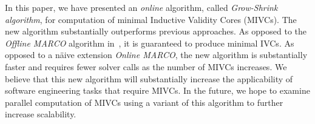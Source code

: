 In this paper, we have presented an {\em online} algorithm, called {\em Grow-Shrink algorithm}, for computation of minimal Inductive Validity Cores (MIVCs). The new algorithm substantially outperforms previous approaches.  As opposed to the {\em Offline MARCO} algorithm in~\cite{Ghass17AllIVCs}, it is guaranteed to produce minimal IVCs.  As opposed to a n\"aive extension {\em Online MARCO}, the new algorithm is substantially faster and requires fewer solver calls as the number of MIVCs increases.  We believe that this new algorithm will substantially increase the applicability of software engineering tasks that require MIVCs.  In the future, we hope to examine parallel computation of MIVCs using a variant of this algorithm to further increase scalability.
